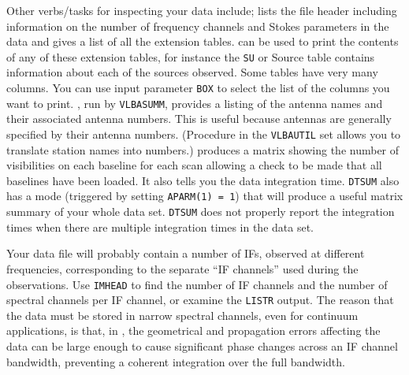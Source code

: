 Other verbs/tasks for inspecting your data include;
\xben
{} lists the file header including
    information on the number of frequency channels and Stokes
    parameters in the data and gives a list of all the extension
    tables.
 can be used to print the contents of any of
    these extension tables, for instance the {\tt SU} or Source table
    contains information about each of the sources observed.  Some
    tables have very many columns. You can use input parameter
    {\tt BOX} to select the list of the columns you want to print.
, run by {\tt VLBASUMM}, provides a listing of
    the antenna names and their associated antenna numbers.  This is
    useful because antennas are generally specified by their antenna
    numbers.  (Procedure {\tt {}} in the {\tt VLBAUTIL} set
    allows you to translate station names into numbers.)
 produces a matrix showing the number
    of visibilities on each baseline for each scan allowing a check to
    be made that all baselines have been loaded.  It also tells you
    the data integration time.  {\tt DTSUM} also has a mode (triggered
    by setting {\tt APARM(1) = 1}) that will produce a useful matrix
    summary of your whole data set.  {\tt DTSUM} does not properly
    report the integration times when there are multiple integration
    times in the data set.
\xeen


Your data file will probably contain a number of IFs, observed at
different frequencies, corresponding to the separate ``IF channels''
used during the observations.  Use {\tt IMHEAD} to find the number of
IF channels and the number of spectral channels per IF channel, or
examine the {\tt LISTR} output.  The reason that the data must be
stored in narrow spectral channels, even for continuum applications,
is that, in , the geometrical and propagation errors
affecting the data can be large enough to cause significant phase
changes across an IF channel bandwidth, preventing a coherent
integration over the full bandwidth.

